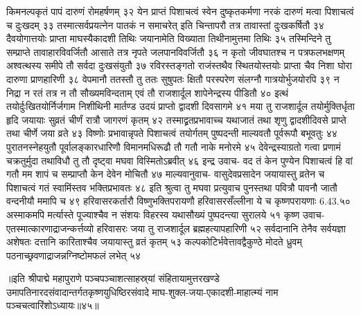 किमनल्पकृतं पापं दारुणं रोमहर्षणम् ३२
येन प्राप्तं पिशाचत्वं स्वेन दुष्कृतकर्मणा 
नरकं दारुणं मत्वा पिशाचत्वं च दुःखदम् ३३
तस्मात्सर्वप्रयत्नेन पातकं न समाचरेत् 
इति चिन्तापरौ तत्र तावास्तां दुःखकर्षितौ ३४
दैवयोगात्तयोः प्राप्ता माघस्यैकादशी तिथिः 
जयानामेति विख्याता तिथीनामुत्तमा तिथिः ३५
तस्मिन्दिने तु सम्प्राप्ते तावाहारविवर्जितौ 
आसाते तत्र नृपते जलपानविवर्जितौ ३६
न कृतो जीवघातश्च न पत्रफलभक्षणम् 
अश्वत्थस्य समीपे तौ सर्वदा दुःखसंयुतौ ३७
रविरस्तङ्गतो राजंस्तथैव स्थितयोस्तयोः 
प्राप्ता चैव निशा घोरा दारुणा प्राणहारिणी ३८
वेपमानौ ततस्तौ तु ततः सुषुपतः क्षितौ 
परस्परेण संलग्नौ गात्रयोर्भुजयोरपि ३९
न निद्रा न रतं तत्र न तौ सौख्यमविन्दताम् 
एवं तौ राजशार्दूल शापेनेन्द्रस्य पीडितौ ४०
इत्थं तयोर्दुःखितयोर्निर्जगाम निशीथिनी 
मार्तण्ड उदयं प्राप्तो द्वादशी दिवसागमे ४१
मया तु राजशार्दूल तयोर्मुक्तिर्धृता हृदि 
जयायाः सुव्रतं चीर्णं रात्रौ जागरणं कृतम् ४२
तस्माद्व्रतप्रभावाच्च यथाजातं तथा शृणु 
द्वादशीदिवसे प्राप्ते तथा चीर्णे जया व्रते ४३
विष्णोः प्रभावान्नृपते पिशाचत्वं तयोर्गतम् 
पुष्पदन्ती माल्यवतौ पूर्वरूपौ बभूवतुः ४४
पुरातनस्नेहयुतौ  पूर्वालङ्कारधारिणौ 
विमानमधिरूढौ तौ गतौ नाके मनोरमे ४५
देवेन्द्रस्याग्रतो गत्वा प्रणामं चक्रतुर्मुदा 
तथाविधौ तु तौ दृष्ट्वा मघवा विस्मितोऽब्रवीत् ४६
इन्द्र उवाच-
वद तं केन पुण्येन पिशाचत्वं हि वां गतौ 
मम शापं च सम्प्राप्तौ केन देवेन मोचितौ ४७
माल्यवानुवाच-
वासुदेवप्रसादेन जयायास्तु व्रतेन च 
पिशाचत्वं गतं स्वामिंस्तव भक्तिप्रभावतः ४८
इति श्रुत्वा तु मघवा प्रत्युवाच पुनस्तथा 
पवित्रौ पावनौ जातौ वन्दनीयौ ममापि च ४९
हरिवासरकर्तारौ विष्णुभक्तिपरायणौ 
हरिवासरसँल्लीना ये च कृष्णपरायणाः 6.43.५०
अस्माकमपि मर्त्यास्ते पूज्याश्चैव न संशयः 
विहरस्व यथासौख्यं पुष्पदन्त्या सुरालये ५१
कृष्ण उवाच-
एतस्मात्कारणाद्राजन्कर्त्तव्यो हरिवासरः 
जया तु राजशार्दूल ब्रह्महत्यापहारिणी ५२
सर्वदानानि तेनैव सर्वयज्ञा अशेषतः 
दत्तानि कारिताश्चैव जयायास्तु व्रतं कृतम् ५३
कल्पकोटिर्भवेत्तावद्वैकुण्ठे मोदते ध्रुवम् 
पठनाच्छ्रवणाद्राजन्नग्निष्टोमफलं लभेत् ५४

॥इति श्रीपाद्मे महापुराणे पञ्चपञ्चाशत्साहस्र्यां संहितायामुत्तरखण्डे उमापतिनारदसंवादान्तर्गतकृष्णयुधिष्ठिरसंवादे माघ-शुक्ल-जया-एकादशी-माहात्म्यं नाम पञ्चचत्वारिंशोऽध्यायः॥४५॥



